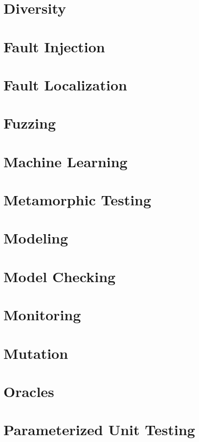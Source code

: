 \section{Diversity}

\section{Fault Injection}

\section{Fault Localization}

\section{Fuzzing}

\section{Machine Learning}

\section{Metamorphic Testing}

\section{Modeling}

\section{Model Checking}

\section{Monitoring}

\section{Mutation}

\section{Oracles}

\section{Parameterized Unit Testing}

